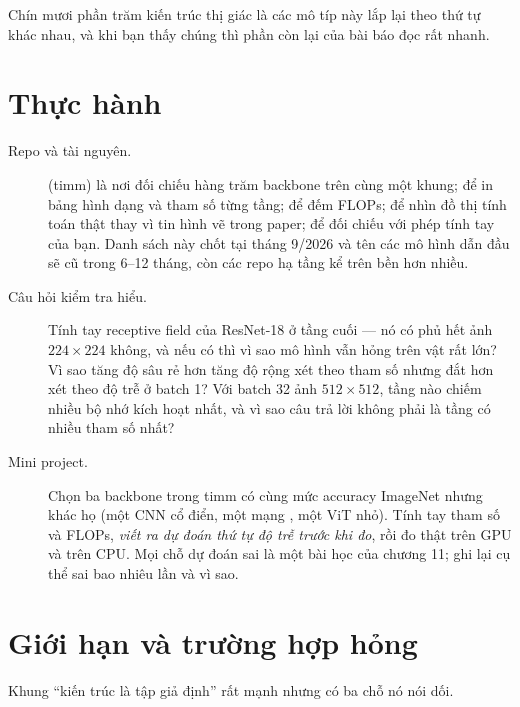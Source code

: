 \documentclass[../../deep_learning.tex]{subfiles}
\begin{document}
Chín mươi phần trăm kiến trúc thị giác là các mô típ này lắp lại theo thứ tự khác nhau, và khi bạn thấy chúng thì phần còn lại của bài báo đọc rất nhanh.

\section{Thực hành}

\begin{description}
\item[Repo và tài nguyên.]  (timm) là nơi đối chiếu hàng trăm backbone trên cùng một khung;  để in bảng hình dạng và tham số từng tầng;  để đếm FLOPs;  để nhìn đồ thị tính toán thật thay vì tin hình vẽ trong paper;  để đối chiếu với phép tính tay của bạn. Danh sách này chốt tại tháng 9/2026 và tên các mô hình dẫn đầu sẽ cũ trong 6--12 tháng, còn các repo hạ tầng kể trên bền hơn nhiều.
\item[Câu hỏi kiểm tra hiểu.] Tính tay receptive field của ResNet-18 ở tầng cuối --- nó có phủ hết ảnh \(224\times224\) không, và nếu có thì vì sao mô hình vẫn hỏng trên vật rất lớn? Vì sao tăng độ sâu rẻ hơn tăng độ rộng xét theo tham số nhưng đắt hơn xét theo độ trễ ở batch 1? Với batch 32 ảnh \(512\times512\), tầng nào chiếm nhiều bộ nhớ kích hoạt nhất, và vì sao câu trả lời không phải là tầng có nhiều tham số nhất?
\item[Mini project.] Chọn ba backbone trong timm có cùng mức accuracy ImageNet nhưng khác họ (một CNN cổ điển, một mạng , một ViT nhỏ). Tính tay tham số và FLOPs, \emph{viết ra dự đoán thứ tự độ trễ trước khi đo}, rồi đo thật trên GPU và trên CPU. Mọi chỗ dự đoán sai là một bài học của chương 11; ghi lại cụ thể sai bao nhiêu lần và vì sao.
\end{description}

\section{Giới hạn và trường hợp hỏng}

Khung ``kiến trúc là tập giả định'' rất mạnh nhưng có ba chỗ nó nói dối.
\end{document}
